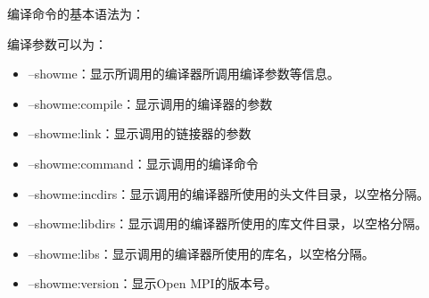 \documentclass[a4paper,12pt,english]{sphinxmanual}
\begin{document}
\sphinxAtStartPar
编译命令的基本语法为：

\sphinxAtStartPar
编译参数可以为：
\begin{itemize}
\item {} 
\sphinxAtStartPar
–showme：显示所调用的编译器所调用编译参数等信息。

\item {} 
\sphinxAtStartPar
–showme:compile：显示调用的编译器的参数

\item {} 
\sphinxAtStartPar
–showme:link：显示调用的链接器的参数

\item {} 
\sphinxAtStartPar
–showme:command：显示调用的编译命令

\item {} 
\sphinxAtStartPar
–showme:incdirs：显示调用的编译器所使用的头文件目录，以空格分隔。

\item {} 
\sphinxAtStartPar
–showme:libdirs：显示调用的编译器所使用的库文件目录，以空格分隔。

\item {} 
\sphinxAtStartPar
–showme:libs：显示调用的编译器所使用的库名，以空格分隔。

\item {} 
\sphinxAtStartPar
–showme:version：显示Open MPI的版本号。

\end{itemize}
\end{document}
